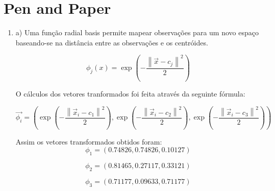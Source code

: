 \documentclass[a4paper,12pt]{article} %
\begin{document}
\section*{Pen and Paper}
\begin{enumerate}

\item 




a) Uma função radial basis permite mapear observações para um novo espaço 
baseando-se na distância entre as observações e os centróides.

\begin{equation}
    \phi_j (x) = \exp\left(-\frac{\left\|\vec{x}-c_j\right\|^2}{2}\right)
\end{equation}

O cálculos dos vetores tranformados foi feita através da seguinte fórmula:

\begin{equation}
\vec{\phi_i} = \left( \exp\left(-\frac{\left\|\vec{x}_i-c_1\right\|^2}{2}\right)   , \exp\left(-\frac{\left\|\vec{x}_i-c_2\right\|^2}{2}\right)  , \exp\left(-\frac{\left\|\vec{x}_i-c_3\right\|^2}{2}\right)   \right)
\end{equation}

Assim os vetores transformados obtidos foram:
\begin{equation*}
    \phi_1 = (0.74826,0.74826,0.10127)
\end{equation*}

\begin{equation*}
    \phi_2 = (0.81465,0.27117,0.33121)
\end{equation*}

\begin{equation*}
    \phi_3 = (0.71177,0.09633,0.71177)
\end{equation*}


\end{enumerate}
\end{document}
